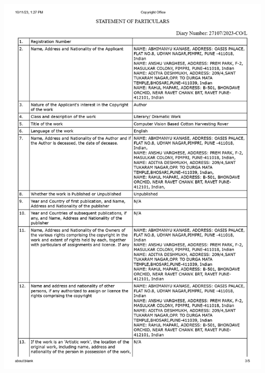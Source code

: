 \documentclass[12pt,a4paper]{report}
\begin{document}
\includegraphics[scale=0.7]
{images/copyright/Form14_page-0003.jpg}
\newpage
\end{document}
